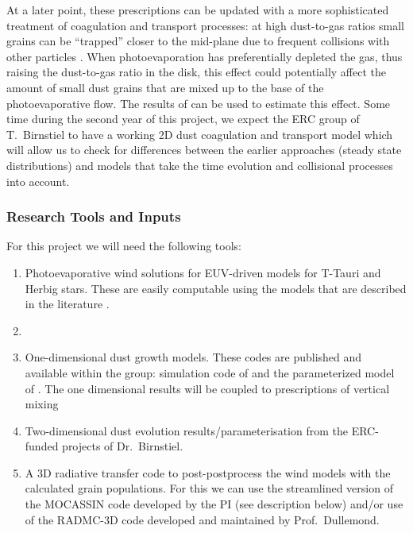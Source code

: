 \documentclass[10pt,fleqn,twoside]{article}
\begin{document}
At a later point, these prescriptions can be updated with a more
sophisticated treatment of coagulation and transport processes: at
high dust-to-gas ratios small grains can be ``trapped'' closer to the
mid-plane due to frequent collisions with other particles
\citep{2016ApJ...822..111K}. When photoevaporation has preferentially
depleted the gas, thus raising the dust-to-gas ratio in the disk, this
effect could potentially affect the amount of small dust grains that
are mixed up to the base of the photoevaporative flow. The results of
\citet{2016ApJ...822..111K} can be used to estimate this effect.
Some time during the second  year of this project, we expect the ERC
group of T.\ Birnstiel to have a working 2D dust coagulation and
transport model which will allow us to check for differences between
the earlier approaches (steady state distributions) and models that
take the time evolution and collisional processes into account.

\subsubsection{Research Tools and Inputs}

For this project we will need the following tools:
\begin{enumerate}
\item Photoevaporative wind solutions for EUV-driven
models for T-Tauri and Herbig stars. These are easily computable 
using the models that are described in the literature \citep[e.g.,][]{2004ApJ...607..890F}.
\item {}
\item One-dimensional dust growth models. These codes are published
and available within the group: simulation code of 
 \citet{2010A&A...513A..79B} and the parameterized model of
 \citet{2012A&A...539A.148B}. The one dimensional results will be
 coupled to prescriptions of vertical mixing \citep[e.g.,][]{2009A&A...496..597F}
\item Two-dimensional dust evolution results/parameterisation from the
  ERC-funded projects of Dr.\ Birnstiel.
\item A 3D radiative transfer code to post-postprocess the wind
models with the calculated grain populations. For this we can use the
streamlined version of the {\sc MOCASSIN} code developed by the PI
(see description below) and/or use  of the
{\sc RADMC-3D} code developed and maintained by Prof.\ Dullemond. 
\end{enumerate}
\end{document}
